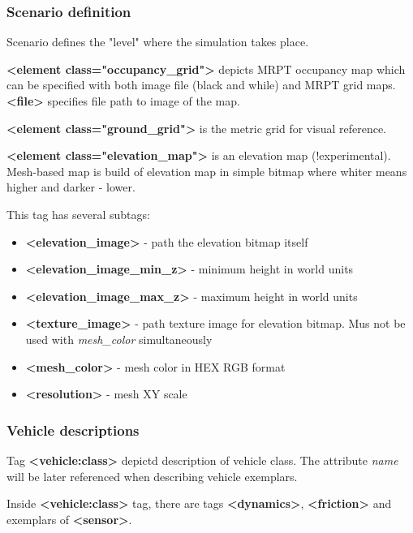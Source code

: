 \documentclass[a4paper,11pt]{article}
\begin{document}
\subsubsection{Scenario definition}

Scenario defines the "level" where the simulation takes place.


\textbf{\textless element class="occupancy\_grid"\textgreater} depicts MRPT occupancy map which can be specified with both image file (black and while) and MRPT grid maps.
\textbf{\textless file\textgreater} specifies file path to image of the map.

\textbf{\textless element class="ground\_grid"\textgreater} is the metric grid for visual reference.

\textbf{\textless element class="elevation\_map"\textgreater} is an elevation map (!experimental). Mesh-based map is build of elevation map in simple bitmap where whiter means higher and darker - lower.

This tag has several subtags:

\begin{itemize}
	\item \textbf{\textless elevation\_image\textgreater} - path the elevation bitmap itself
	\item \textbf{\textless elevation\_image\_min\_z\textgreater} - minimum height in world units
	\item \textbf{\textless elevation\_image\_max\_z\textgreater} - maximum height in world units
	\item \textbf{\textless texture\_image\textgreater} - path texture image for elevation bitmap. Mus not be used with \textit{mesh\_color} simultaneously
	\item \textbf{\textless mesh\_color\textgreater} - mesh color in HEX RGB format
	\item \textbf{\textless resolution\textgreater} - mesh XY scale
\end{itemize}

\subsubsection{Vehicle descriptions}

Tag \textbf{\textless vehicle:class\textgreater} depictd description of vehicle class. The attribute \textit{name} will be later referenced when describing vehicle exemplars.

Inside \textbf{\textless vehicle:class\textgreater} tag, there are tags \textbf{\textless dynamics\textgreater}, \textbf{\textless friction\textgreater} and exemplars of \textbf{\textless sensor\textgreater}.
\end{document}
